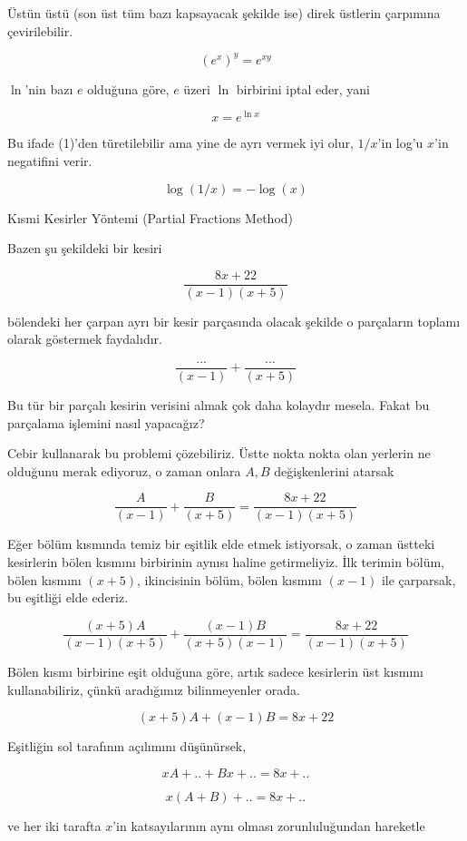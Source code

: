 \documentclass[12pt,fleqn]{article}\usepackage{../../common}
\begin{document}
Üstün üstü (son üst tüm bazı kapsayacak şekilde ise) direk üstlerin
çarpımına çevirilebilir.

$$ (e^x)^y = e^{xy} $$

$\ln$'nin bazı $e$ olduğuna göre, $e$ üzeri $\ln$ birbirini iptal eder,
yani

$$ x = e^{\ln x} $$

Bu ifade (1)'den türetilebilir ama yine de ayrı vermek iyi olur, $1/x$'in
log'u $x$'in negatifini verir. 

$$ \log(1/x) = -\log(x) $$

\newpage

Kısmi Kesirler Yöntemi (Partial Fractions Method)

Bazen şu şekildeki bir kesiri 

$$ \frac{8x + 22}{(x-1)(x+5)} $$

bölendeki her çarpan ayrı bir kesir parçasında olacak şekilde o parçaların
toplamı olarak göstermek faydalıdır. 

$$ \frac{...}{(x-1)} + \frac{...}{(x+5)} $$

Bu tür bir parçalı kesirin verisini almak çok daha kolaydır
mesela. Fakat bu parçalama işlemini nasıl yapacağız?

Cebir kullanarak bu problemi çözebiliriz. Üstte nokta nokta olan yerlerin
ne olduğunu merak ediyoruz, o zaman onlara $A,B$ değişkenlerini atarsak

$$ \frac{A}{(x-1)} + \frac{B}{(x+5)} = \frac{8x + 22}{(x-1)(x+5)}$$

Eğer bölüm kısmında temiz bir eşitlik elde etmek istiyorsak, o zaman
üstteki kesirlerin bölen kısmını birbirinin aynısı haline getirmeliyiz. İlk
terimin bölüm, bölen kısmını $(x+5)$, ikincisinin bölüm, bölen kısmını
$(x-1)$ ile çarparsak, bu eşitliği elde ederiz. 

$$ \frac{(x+5)A}{(x-1)(x+5)} + \frac{(x-1)B}{(x+5)(x-1)} = 
\frac{8x + 22}{(x-1)(x+5)}
$$

Bölen kısmı birbirine eşit olduğuna göre, artık sadece kesirlerin üst
kısmını kullanabiliriz, çünkü aradığımız bilinmeyenler orada. 

$$ (x+5)A + (x-1)B = 8x+22 $$

Eşitliğin sol tarafının açılımını düşünürsek, 

$$ xA + .. + Bx + .. = 8x + .. $$

$$ x(A + B) +  .. = 8x + .. $$

ve her iki tarafta $x$'in katsayılarının aynı olması zorunluluğundan
hareketle
\end{document}
